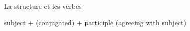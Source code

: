 \begin{frame}{La structure et les verbes}
  \begin{center}
    subject $+$  (conjugated) $+$ participle (agreeing with subject)
  \end{center}
\end{frame}